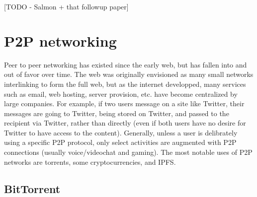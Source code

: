 \documentclass[12pt]{report}
\begin{document}
[TODO - Salmon + that followup paper]

\section{P2P networking}

Peer to peer networking has existed since the early web, but has fallen into and out of favor over time. The web was originally envisioned as many small networks interlinking to form the full web, but as the internet developped, many services such as email, web hosting, server provision, etc. have become centralized by large companies. For example, if two users message on a site like Twitter, their messages are going to Twitter, being stored on Twitter, and passed to the recipient via Twitter, rather than directly (even if both users have no desire for Twitter to have access to the content). Generally, unless a user is delibrately using a specific P2P protocol, only select activities are augmented with P2P connections (usually voice/videochat and gaming). The most notable uses of P2P networks are torrents, some cryptocurrencies, and IPFS.

\subsection{BitTorrent}
\label{torrent}
\end{document}
